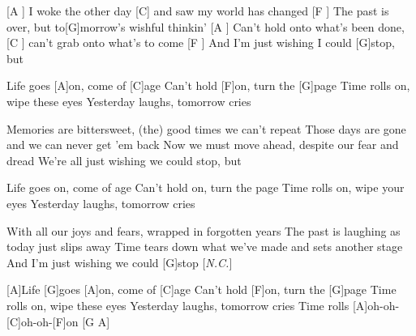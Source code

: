 

\begin{guitar}
	[A ] I woke the other day [C] and saw my world has changed
	[F ] The past is over, but to[G]morrow's wishful thinkin'
	[A ] Can't hold onto what's been done, [C ] can't grab onto what's to come
	[F ] And I'm just wishing I could [G]stop, but
	
	Life goes [A]on, come of [C]age
	Can't hold [F]on, turn the [G]page
	Time rolls on, wipe these eyes
	Yesterday laughs, tomorrow cries
	
	Memories are bittersweet, (the) good times we can't repeat
	Those days are gone and we can never get 'em back
	Now we must move ahead, despite our fear and dread
	We're all just wishing we could stop, but
	
	Life goes on, come of age
	Can't hold on, turn the page
	Time rolls on, wipe your eyes
	Yesterday laughs, tomorrow cries

	With all our joys and fears, wrapped in forgotten years
	The past is laughing as today just slips away
	Time tears down what we've made and sets another stage
	And I'm just wishing we could [G]stop [\textit{N.C.}]{}
	
	[A]Life [G]goes [A]on, come of [C]age
	Can't hold [F]on, turn the [G]page
	Time rolls on, wipe these eyes
	Yesterday laughs, tomorrow cries
	Time rolls [A]oh-oh-[C]oh-oh-[F]on [G A]{}\hfill\end{guitar}